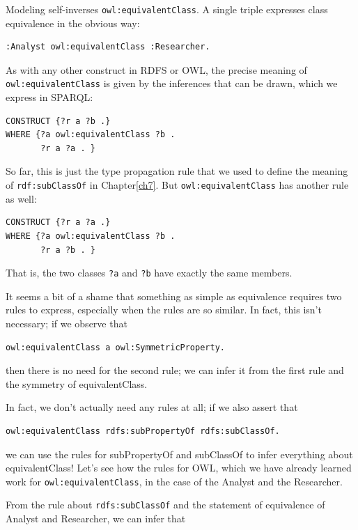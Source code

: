 \begin{challenge}{Modeling self-inverses}
\texttt{owl:equivalentClass}. A single triple expresses class equivalence in the
obvious way:

\begin{lstlisting}
:Analyst owl:equivalentClass :Researcher.
\end{lstlisting}

As with any other construct in RDFS or OWL, the precise meaning of
\texttt{owl:equivalentClass} is given by the inferences that can be drawn, which
we express in SPARQL:

\begin{lstlisting}
CONSTRUCT {?r a ?b .}
WHERE {?a owl:equivalentClass ?b .
       ?r a ?a . }
\end{lstlisting}

So far, this is just the type propagation rule that we used to define
the meaning of \texttt{rdf:subClassOf} in Chapter\ref{ch7}. But \texttt{owl:equivalentClass} has another rule as
well:

\begin{lstlisting}
CONSTRUCT {?r a ?a .}
WHERE {?a owl:equivalentClass ?b .
       ?r a ?b . }
\end{lstlisting}

That is, the two classes \texttt{?a} and \texttt{?b} have exactly the same members.

It seems a bit of a shame that something as simple as equivalence
requires two rules to express, especially when the rules are so similar.
In fact, this isn't necessary; if we observe that

\begin{lstlisting}
owl:equivalentClass a owl:SymmetricProperty.
\end{lstlisting}

then there is no need for the second rule; we can infer it from the
first rule and the symmetry of
equivalentClass.

In fact, we don't actually need any rules at all; if we also assert that

\begin{lstlisting}
owl:equivalentClass rdfs:subPropertyOf rdfs:subClassOf.
\end{lstlisting}

we can use the rules for subPropertyOf and subClassOf to infer
everything about equivalentClass! Let's see how the rules for OWL, which
we have already learned work for \texttt{owl:equivalentClass}, in the case of the
Analyst and the Researcher.

From the rule about \texttt{rdfs:subClassOf} and the statement of equivalence of
Analyst and
Researcher, we can infer that


\end{challenge}
